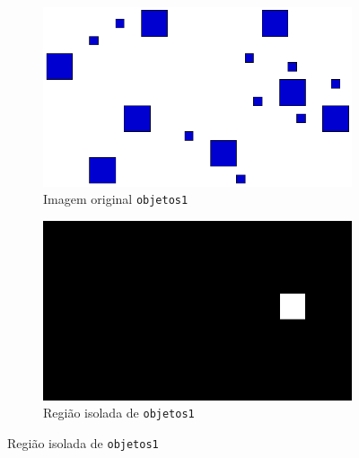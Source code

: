 \documentclass[brazilian,a4paper,twocolumn]{article}
\begin{document}
        \begin{figure}[H]
            \centering

            \begin{subfigure}{0.23\textwidth}
                \includegraphics[width=\textwidth,keepaspectratio]{objetos1}
                \caption{Imagem original \texttt{objetos1}}
                \label{fig:objetos1-regioes-orig}
            \end{subfigure}
            \hfill
            \begin{subfigure}{0.23\textwidth}
                \includegraphics[width=\textwidth,keepaspectratio]{regioes/objetos1-region-9}
                \caption{Região isolada de \texttt{objetos1}}
                \label{fig:objetos1-regioes-isolada}
            \end{subfigure}


\end{figure}
\end{document}
